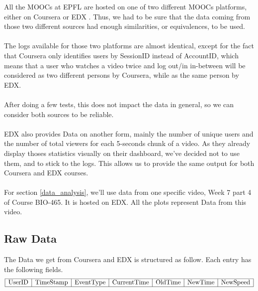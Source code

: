 \documentclass[11pt,a4paper]{article}
\begin{document}
All the MOOCs at EPFL are hosted on one of two different MOOCs platforms, either on Coursera \cite{coursera} or EDX \cite{edx}. Thus, we had to be sure that the data coming from those two different sources had enough similarities, or equivalences, to be used. \\
\\
The logs available for those two platforms are almost identical, except for the fact that Coursera only identifies users by SessionID instead of AccountID, which means that a user who watches a video twice and log out/in in-between will be considered as two different persons by Coursera, while as the same person by EDX. \\
\\
After doing a few tests, this does not impact the data in general, so we can consider both sources to be reliable. \\
\\
EDX also provides Data on another form, mainly the number of unique users and the number of total viewers for each 5-seconds chunk of a video. As they already display thoses statistics visually on their dashboard, we've decided not to use them, and to stick to the logs. This allows us to provide the same output for both Coursera and EDX courses. \\
\\
For section \ref{data_analysis}, we'll use data from one specific video, Week 7 part 4 of Course BIO-465. It is hosted on EDX. All the plots represent Data from this video.

\newpage

\subsection{Raw Data}

The Data we get from Coursera and EDX is structured as follow. Each entry has the following fields. \\
\begin{align*}
\begin{array}{|c|c|c|c|c|c|c|}
\hline
\text{UserID} & \text{TimeStamp} & \text{EventType} & \text{CurrentTime} & \text{OldTime} & \text{NewTime} & \text{NewSpeed}\\
\hline
\end{array}
\end{align*}
\end{document}
